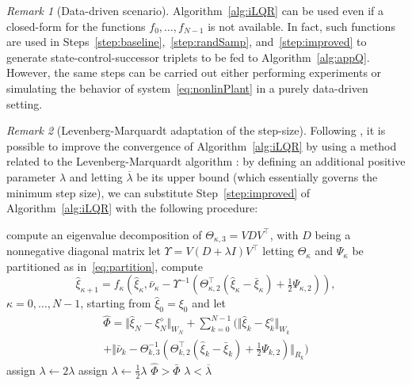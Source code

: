 \documentclass[10pt]{IEEEtran}      %
\theoremstyle{theorem}
\theoremstyle{remark}
\newtheorem{remm}{Remark}
\begin{document}
\begin{remm}[Data-driven scenario]
Algorithm~\ref{alg:iLQR} can be used even if a closed-form for the functions $f_0,\dots,f_{N-1}$
is not available. In fact, such functions are used in Steps~\ref{step:baseline},~\ref{step:randSamp}, and~\ref{step:improved}
to generate state-control-successor triplets to be fed to Algorithm~\ref{alg:appQ}. However, the same steps can be carried out
either performing experiments or simulating the behavior of system~\eqref{eq:nonlinPlant} in a purely data-driven setting.
\end{remm}

\begin{remm}[Levenberg-Marquardt adaptation of the step-size]\label{rem:LMa}
Following \cite{1469949}, it is possible to improve the convergence of Algorithm~\ref{alg:iLQR}
by using a method related to the Levenberg-Marquardt algorithm \cite{levenberg1944method,marquardt1963algorithm}:
by defining an additional positive parameter $\lambda$ and letting $\overline{\lambda}$ be its upper bound
(which essentially governs the minimum step size),
we can substitute Step~\ref{step:improved} of Algorithm~\ref{alg:iLQR} with the following procedure:

\begin{algorithmic}[1]
\STATE compute an eigenvalue decomposition of $\Theta_{\kappa,3}= V D V^\top$, with $D$ being a nonnegative diagonal matrix
\REPEAT
	\STATE let $\Upsilon= V (D+\lambda I) V^\top$
	\STATE letting $\Theta_{\kappa}$ and $\Psi_{\kappa}$ be partitioned as in~\eqref{eq:partition}, compute 
			\begin{equation*}
			\hat{\xi}_{\kappa+1}=f_\kappa\left(\hat{\xi}_{\kappa},\bar{\nu}_{\kappa}-\Upsilon^{-1}\left(\Theta_{\kappa,2}^\top (\hat{\xi}_{\kappa}-\bar{\xi}_{\kappa})+\tfrac{1}{2}\Psi_{\kappa,2}\right)\right),
			\end{equation*}
			 $\kappa=0,\dots,N-1$, starting from $\hat{\xi}_0=\xi_0$ and let 
			\begin{multline*}
			\hat{\Phi}=\Vert \hat{\xi}_{N}-\xi_N^\diamond\Vert_{W_N}+\sum_{k=0}^{N-1}\bigg(\Vert \hat{\xi}_{k}-\xi_k^\diamond\Vert_{W_k}\\
			+\Vert \bar{\nu}_{k}-\Theta_{k,3}^{-1}(\Theta_{k,2}^\top (\hat{\xi}_{k}-\bar{\xi}_{k})+\tfrac{1}{2}\Psi_{k,2}) \Vert_{R_k}\bigg)
			\end{multline*}
		\IF{$\lambda < \overline{\lambda}$}
			\STATE assign $\lambda \leftarrow 2 \lambda$
		\ELSE
			\STATE assign $\lambda \leftarrow \frac{1}{2}\lambda$
		\ENDIF
\UNTIL $\hat{\Phi}>\bar{\Phi}$ \AND $\lambda < \overline{\lambda}$
\end{algorithmic}


\end{remm}
\end{document}
